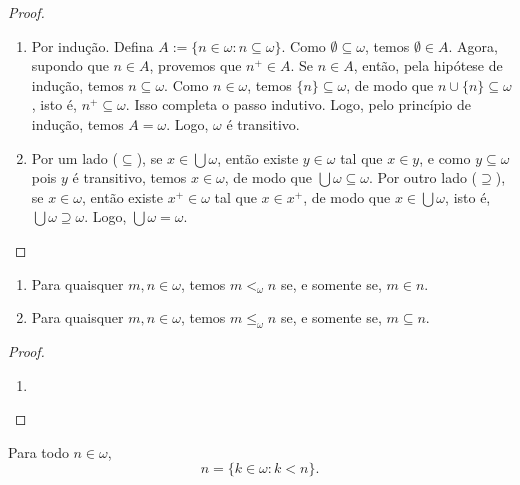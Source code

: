 \begin{proof}
    \leavevmode
        \begin{enumerate}[leftmargin=*, align=left, label=\textbf{(\alph*)}]
            \item Por indução. Defina $A := \{n \in \omega : n \subseteq \omega\}$. Como $\emptyset \subseteq \omega$, temos $\emptyset \in A$. Agora, supondo que $n \in A$, provemos que $n^+ \in A$. Se $n \in A$, então, pela hipótese de indução, temos $n \subseteq \omega$. Como $n \in \omega$, temos $\{n\} \subseteq \omega$, de modo que $n \cup \{n\} \subseteq \omega$, isto é, $n^+ \subseteq \omega$. Isso completa o passo indutivo. Logo, pelo princípio de indução, temos $A = \omega$. Logo, $\omega$ é transitivo. \blackproof
            \item Por um lado ($\subseteq$), se $x \in \bigcup \omega$, então existe $y \in \omega$ tal que $x \in y$, e como $y \subseteq \omega$ pois $y$ é transitivo, temos $x \in \omega$, de modo que $\bigcup \omega \subseteq \omega$. Por outro lado ($\supseteq$), se $x \in \omega$, então existe $x^+ \in \omega$ tal que $x \in x^+$, de modo que $x \in \bigcup \omega$, isto é, $\bigcup \omega \supseteq \omega$. Logo, $\bigcup \omega = \omega$. \blackproof
        \end{enumerate}
\end{proof}

\begin{proposition}
    \leavevmode
        \begin{enumerate}[leftmargin=*, align=left, label=\textbf{(\alph*)}]
            \item Para quaisquer $m,n \in \omega$, temos $m <_{\omega} n$ se, e somente se, $m \in n$.
            \item Para quaisquer $m,n \in \omega$, temos $m \leq_{\omega} n$ se, e somente se, $m \subseteq n$.
        \end{enumerate}
\end{proposition}

\begin{proof}
    \leavevmode
        \begin{enumerate}[leftmargin=*, align=left, label=\textbf{(\alph*)}]
            \item 
        \end{enumerate}
\end{proof}

\begin{corollary}
    Para todo $n \in \omega$,
        \[
            n = \{k \in \omega : k < n\}.
        \]
\end{corollary}

